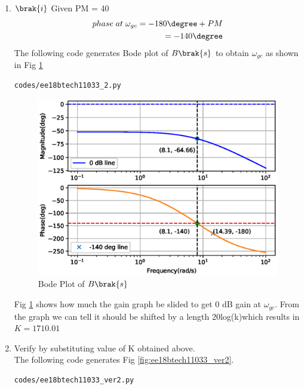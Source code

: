 \begin{enumerate}[label=\thesubsection.\arabic*.,ref=\thesubsection.\theenumi]
\item $\brak{i}$ Given PM = 40\degree
\\
\solution
\begin{align}
    phase\; at\; \omega_{gc} = -180\degree + PM
    \\
    = -140\degree
\end{align}
The following code generates Bode plot of $B\brak{s}$ to obtain $\omega_{gc}$ as shown in Fig \ref{fig:ee18btech11033_2}

\begin{lstlisting}
codes/ee18btech11033_2.py
\end{lstlisting}

\begin{figure}[!ht]
\centering
\includegraphics[width=\columnwidth]{./figs/ee18btech11033_2.eps}
\caption{Bode Plot of $B\brak{s}$}
\label{fig:ee18btech11033_2}
\end{figure}
Fig \ref{fig:ee18btech11033_2} shows how much the gain graph be slided to get 0 dB gain at $\omega_{gc}$.
From the graph we can tell it should be shifted by a length 20log(k)which results in  $K =1710.01$ 
\item Verify by substituting value of K obtained above. 
\\
\solution The following code generates Fig \ref{fig:ee18btech11033_ver2}.

\begin{lstlisting}
codes/ee18btech11033_ver2.py
\end{lstlisting}


\end{enumerate}
